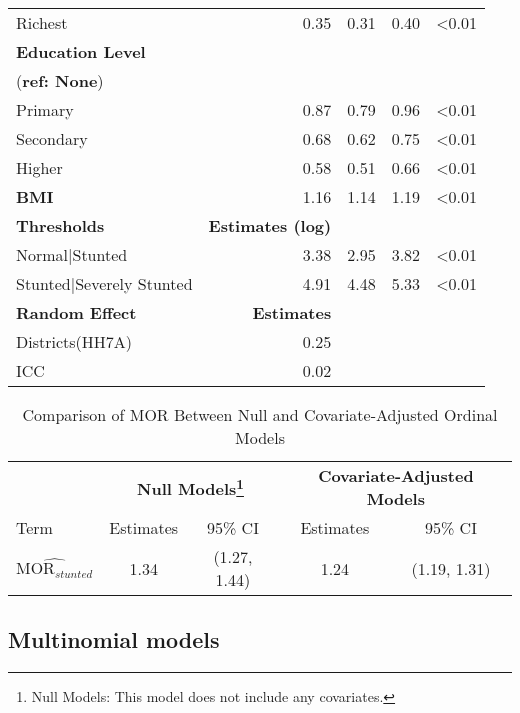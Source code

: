 \documentclass[
  letterpaper,
  DIV=11,
  numbers=noendperiod]{scrartcl}
\begin{document}
\begin{table}[h!]
\begin{tabular}{lrrrl}
\quad Richest & 0.35 & 0.31 & 0.40 & <0.01\\
\addlinespace
\textbf{Education Level} & & & & \\
(\textbf{ref: None}) \\
\quad Primary & 0.87 & 0.79 & 0.96 & <0.01\\
\quad Secondary & 0.68 & 0.62 & 0.75 & <0.01\\
\quad Higher & 0.58 & 0.51 & 0.66 & <0.01\\
\addlinespace
\textbf{BMI} & 1.16 & 1.14 & 1.19 & <0.01\\
\addlinespace
\hline
\textbf{Thresholds} & \textbf{Estimates (log)} & & & \\
\quad Normal|Stunted & 3.38 & 2.95 & 3.82 & <0.01\\
\quad Stunted|Severely Stunted & 4.91 & 4.48 & 5.33 & <0.01\\
\addlinespace
\hline
\textbf{Random Effect} & \textbf{Estimates} & & & \\
\quad Districts(HH7A) & 0.25 & & & \\
\quad ICC & 0.02 & & & \\
\bottomrule
\end{tabular}
\end{table}

\newpage

\begin{table}[htbp]
\centering
\caption{Comparison of MOR Between Null and Covariate-Adjusted Ordinal Models}
\label{tab:mor_comparison_ord}
\begin{tabular}{@{}lcccc@{}}
\toprule
 & \multicolumn{2}{c}{\textbf{Null Models\footnote{Null Models: This model does not include any covariates.}}} & \multicolumn{2}{c}{\textbf{Covariate-Adjusted Models}} \\
 \cmidrule(lr){2-3} \cmidrule(lr){4-5}
Term & Estimates & 95\% CI & Estimates & 95\% CI \\ 
\midrule
$\widehat{\mbox{MOR}_{stunted}}$ & 1.34 & (1.27, 1.44) & 1.24 & (1.19, 1.31) \\
\bottomrule
\end{tabular}
\scriptsize
{}
\end{table}

\newpage

\subsection{Multinomial models}\label{multinomial-models}
\end{document}
